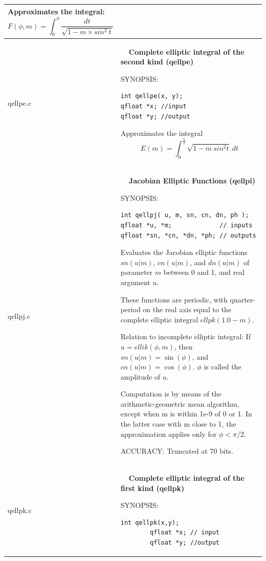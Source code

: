 \documentclass[10pt,a4paper,x11names]{memoir} %
\newcounter{entry}
\newcommand{\TOC}[1] {\addcontentsline{toc}{section}{\theentry\ \  #1} \textbf{\theentry\ \  #1} \par\stepcounter{entry}}
\begin{document}
\begin{longtable}{|p{1.5cm}|p{11.5cm}|}
	 Approximates the integral:
	$$ F(\phi , m) = \int_{0}^{\phi} \frac{dt}{\sqrt{1-m\times sin^2 \ t}}$$
	\\\hline
	qellpe.c & \TOC{Complete elliptic integral of the second kind (qellpe)}
	{\footnotesize SYNOPSIS:}\vspace{-0.2cm}\index{qellpe}
	\begin{lstlisting}[numbers=none]
int qellpe(x, y);
qfloat *x; //input
qfloat *y; //output
	\end{lstlisting}\vspace{-0.2cm}
	Approximates the integral
	$$ E(m) = \int_{0}^{\frac{\pi}{2}} \sqrt{1 - m\ sin^2 t} \ dt$$
	\\\hline
	qellpj.c& \TOC{Jacobian Elliptic Functions (qellpi)}
	
	{\footnotesize SYNOPSIS:}\vspace{-0.2cm}\index{qellpi}
\begin{lstlisting}[numbers=none]
int qellpj( u, m, sn, cn, dn, ph );
qfloat *u, *m;             // inputs
qfloat *sn, *cn, *dn, *ph; // outputs
\end{lstlisting}\vspace{-0.2cm}
	
	
	Evaluates the Jacobian elliptic functions $sn(u|m)$, $cn(u|m)$,
	and $dn(u|m)$ of parameter $m$ between 0 and 1, and real
	argument $u$.
	
	These functions are periodic, with quarter-period on the
	real axis equal to the complete elliptic integral
	$ellpk(1.0-m)$.
	
	Relation to incomplete elliptic integral:
	If $u = ellik(\phi,m)$, then $sn(u|m) = \sin(\phi)$,
	and $cn(u|m) = \cos(\phi)$.  $\phi$ is called the amplitude of $u$.
	
	Computation is by means of the arithmetic-geometric mean
	algorithm, except when m is within 1e-9 of 0 or 1.  In the
	latter case with m close to 1, the approximation applies
	only for $\phi < \pi/2$.
	
	{\footnotesize{ACCURACY:}}  Truncated at 70 bits.
	\\\hline
	qellpk.c& \TOC{Complete elliptic integral of the first kind (qellpk)}
	
	{\footnotesize SYNOPSIS:}\vspace{-0.2cm}\index{qellpk}
	\begin{lstlisting}[numbers=none]
		int qellpk(x,y);
		qfloat *x; // input
		qfloat *y; //output
	\end{lstlisting}\vspace{-0.2cm}
	

\end{longtable}
\end{document}

